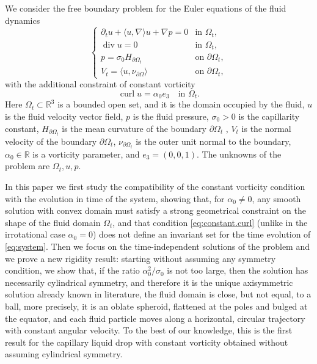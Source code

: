 \documentclass[10pt,reqno,a4paper]{article}
\numberwithin{equation}{section}
\theoremstyle{plain}
\theoremstyle{definition}
\newcommand{\R}{{\mathbb R}}
\renewcommand{\a}{\alpha}
\newcommand{\Om}{\Omega}
\newcommand{\la}{\langle}
\newcommand{\ra}{\rangle}
\newcommand{\pa}{\partial}
\renewcommand{\div}{\operatorname{div}} %
\newcommand{\grad}{\nabla}
\newcommand{\curl}{\operatorname{curl}}
\begin{document}
We consider the free boundary problem for the Euler equations 
of the fluid dynamics 
\begin{equation}\label{eq:system}
\begin{cases}
\pa_t u + \la u , \grad \ra u + \grad p = 0 
& \text{in } \Omega_t,
\\
\div u=0 & \text{in }  \Omega_t,
\\ 
p = \sigma_0 H_{\pa \Omega_t} & \text{on } \partial \Omega_t,
\\
V_t=\la u,\nu_{\pa\Om}\ra & \text{on } \partial \Omega_t,
\end{cases}
\end{equation}
with the additional constraint of constant vorticity 
\begin{equation}\label{eq:constant.curl}
\curl u= \alpha_0 e_3 \quad \text{in } \Om_t.
\end{equation}
Here $\Om_t \subset \R^3$ is a bounded open set,  
and it is the domain occupied by the fluid, 
$u$ is the fluid velocity vector field, 
$p$ is the fluid pressure, 
$\sigma_0>0$ is the capillarity constant, 
$H_{\pa \Omega_t}$ is the mean curvature of the boundary $\pa \Omega_t$ , 
$V_t$ is the normal velocity of the boundary $\pa \Om_t$, 
$\nu_{\pa \Om_t}$ is the outer unit normal to the boundary, 
$\alpha_0 \in \R$ is a vorticity parameter, 
and $e_3 = (0,0,1)$. 
The unknowns of the problem are $\Om_t, u, p$.   

In this paper we first study 
the compatibility of the constant vorticity condition 
with the evolution in time of the system, 
showing that, for $\alpha_0 \neq 0$, any smooth solution with convex domain must satisfy 
a strong geometrical constraint on the shape of the fluid domain $\Om_t$, 
and that condition \eqref{eq:constant.curl} 
(unlike in the irrotational case $\a_0 = 0$) 
does not define an invariant set for the time evolution of \eqref{eq:system}. 
Then we focus on the time-independent solutions of the problem  
and we prove a new rigidity result: starting without assuming any symmetry condition, 
we show that, if the ratio $\alpha_0^2/\sigma_0$ is not too large, 
then the solution has necessarily cylindrical symmetry, 
and therefore it is the unique axisymmetric solution already known in literature, 
the fluid domain is close, but not equal, to a ball, 
more precisely, it is an oblate spheroid, flattened at the poles and bulged at the equator,  
and each fluid particle moves along a horizontal, circular trajectory 
with constant angular velocity. 
To the best of our knowledge, this is the first result 
for the capillary liquid drop with constant vorticity 
obtained without assuming cylindrical symmetry.
\end{document}
